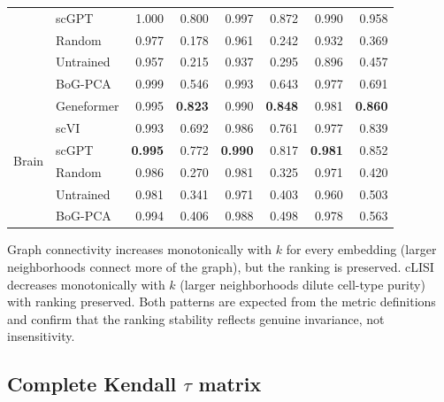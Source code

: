 \documentclass[10pt,letterpaper]{article}
\begin{document}
\begin{table}[h!]
\begin{tabular}{@{}ll rr rr rr@{}}
 & scGPT      & 1.000 & 0.800 & 0.997 & 0.872 & 0.990 & 0.958 \\
 & Random     & 0.977 & 0.178 & 0.961 & 0.242 & 0.932 & 0.369 \\
 & Untrained  & 0.957 & 0.215 & 0.937 & 0.295 & 0.896 & 0.457 \\
 & BoG-PCA    & 0.999 & 0.546 & 0.993 & 0.643 & 0.977 & 0.691 \\
\midrule
\multirow{6}{*}{Brain}
 & Geneformer & 0.995 & \textbf{0.823} & 0.990 & \textbf{0.848} & 0.981 & \textbf{0.860} \\
 & scVI       & 0.993 & 0.692 & 0.986 & 0.761 & 0.977 & 0.839 \\
 & scGPT      & \textbf{0.995} & 0.772 & \textbf{0.990} & 0.817 & \textbf{0.981} & 0.852 \\
 & Random     & 0.986 & 0.270 & 0.981 & 0.325 & 0.971 & 0.420 \\
 & Untrained  & 0.981 & 0.341 & 0.971 & 0.403 & 0.960 & 0.503 \\
 & BoG-PCA    & 0.994 & 0.406 & 0.988 & 0.498 & 0.978 & 0.563 \\
\bottomrule
\end{tabular}
\end{table}

Graph connectivity increases monotonically with $k$ for every embedding (larger neighborhoods connect more of the graph), but the ranking is preserved. cLISI decreases monotonically with $k$ (larger neighborhoods dilute cell-type purity) with ranking preserved. Both patterns are expected from the metric definitions and confirm that the ranking stability reflects genuine invariance, not insensitivity.

\subsection{Complete Kendall $\tau$ matrix}
\end{document}
